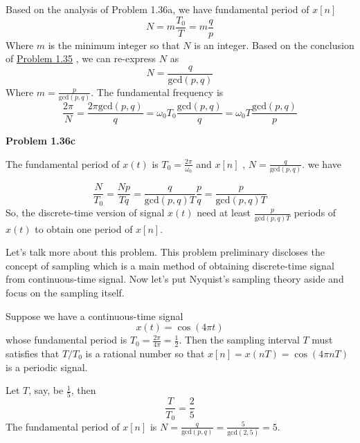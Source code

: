 \documentclass[koma,a4paper,utopia,12pt,listings-color,microtype,paralist,colorlinks,urlcolor=red]{org-article}
\begin{document}
Based on the analysis of Problem 1.36a, we have fundamental period of \(x[n]\)
\begin{equation*}
N = m\frac{T_{0}}{T} = m \frac{q}{p}
\end{equation*}
Where \(m\) is the minimum integer so that \(N\) is an integer. Based on the
conclusion of \hyperref[sec:org1baca05]{Problem 1.35} , we can re-express \(N\) as
\begin{equation*}
N = \frac{q}{\mathrm{gcd}(p,q)}
\end{equation*}
Where \(m = \frac{p}{\mathrm{gcd}(p,q)}\).
The fundamental frequency is
\begin{equation*}
\frac{2\pi}{N} = \frac{2\pi \mathrm{gcd}(p,q)}{q} = \omega_{0}T_{0} \frac{\mathrm{gcd}(p,q)}{q} = \omega_{0}T\frac{\mathrm{gcd}(p,q)}{p}
\end{equation*}

\textbf{Problem 1.36c}

The fundamental period of \(x(t)\) is \(T_{0} = \frac{2\pi}{\omega_{0}}\) and
\(x[n]\) , \(N= \frac{q}{\mathrm{gcd}(p,q)}\). we have

\begin{equation*}
\frac{N}{T_{0}}= \frac{Np}{Tq} = \frac{q}{\mathrm{gcd}(p,q)T} \frac{p}{q} = \frac{p}{\mathrm{gcd}(p,q)T}
\end{equation*}
So, the discrete-time version of signal \(x(t)\) need at least
\(\frac{p}{\mathrm{gcd}(p,q)T}\) periods of \(x(t)\) to obtain one period of \(x[n]\).

Let's talk more about this problem. This problem preliminary discloses the concept
of sampling which is a main method of obtaining discrete-time signal from
continuous-time signal. Now let's put Nyquist's sampling theory aside and focus
on the sampling itself.

Suppose we have a continuous-time signal
\begin{equation*}
x(t) = \cos(4\pi t)
\end{equation*}
whose fundamental period is \(T_{0} = \frac{2\pi }{4\pi} = \frac{1}{2}\). Then
the sampling interval \(T\) must satisfies that \(T/T_{0}\) is a rational
number so that \(x[n]= x(nT)= \cos(4\pi nT )\) is a periodic signal.

Let \(T\), say, be \(\frac{1}{5}\), then
\begin{equation*}
\frac{T}{T_{0}} = \frac{2}{5}
\end{equation*}
The fundamental period of \(x[n]\) is \(N = \frac{q}{\mathrm{gcd}(p,q)} =
\frac{5}{\mathrm{gcd}(2,5)} = 5\).
\end{document}
